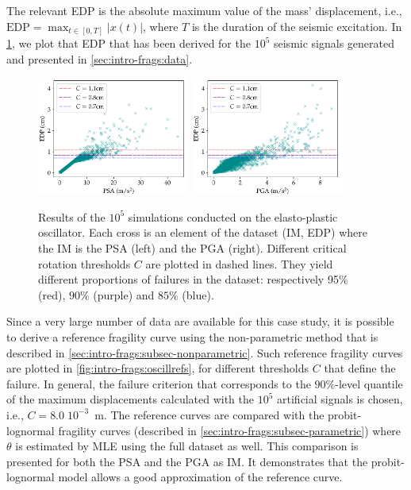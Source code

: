     
    
    The relevant EDP is the absolute maximum value of the mass’ displacement, i.e., $\text{EDP}=\max_{t\in [0, T]}|x(t)|$, where $T$ is the duration of the seismic excitation. In \cref{fig:intro-frags:oscillclouds}, we plot that EDP that has been derived for the $10^5$ seismic signals generated and presented in \cref{sec:intro-frags:data}.

    \begin{figure}[t]
        \centering
        \includegraphics[width=5cm]{figures/intro-frags/oscill/cloudPSA.pdf}
        \includegraphics[width=5cm]{figures/intro-frags/oscill/cloudPGA.pdf}
        \caption{Results of the $10^5$ simulations conducted on the elasto-plastic oscillator. Each cross is an element of the dataset (IM, EDP) where the IM is the PSA (left) and the PGA (right). Different critical rotation thresholds $C$ are plotted in dashed lines. They yield different proportions of failures in the dataset: respectively 95$\%$ (red), $90\%$ (purple) and $85\%$ (blue).}
        \label{fig:intro-frags:oscillclouds}
    \end{figure}


    Since a very large number of data are available for this case study, it is possible to derive a reference fragility curve using the non-parametric method that is described in \cref{sec:intro-frags:subsec-nonparametric}.
    Such reference fragility curves are plotted in \cref{fig:intro-frags:oscillrefs}, for different thresholds $ C $ that define the failure.
    In general, the failure criterion that corresponds to the $90\%$-level quantile of the maximum displacements calculated with the $10^5$ artificial signals is chosen, i.e., $C = 8.0 \; 10^{-3}$~m.
    The reference 
    curves are compared with the probit-lognormal fragility curves (described in \cref{sec:intro-frags:subsec-parametric}) where $\theta$ is estimated by MLE using the full dataset as well. This comparison is presented for both the PSA and the PGA as IM.
    It demonstrates that the probit-lognormal model allows a good approximation of the reference curve.

